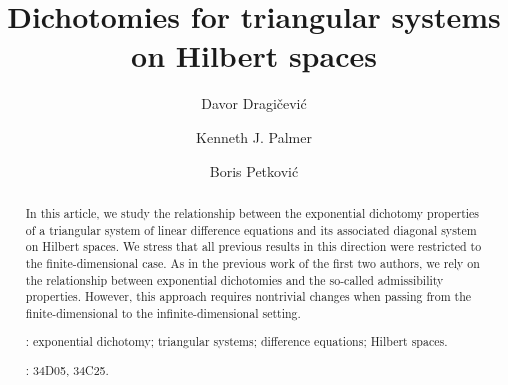 \documentclass[11pt,reqno,a4paper]{amsart}
\theoremstyle{plain}
\numberwithin{equation}{section}
\theoremstyle{remark}
\begin{document}
\title{Dichotomies for triangular systems on Hilbert spaces}

\author{Davor Dragi\v cevi\' c } 
\address{Faculty of Mathematics, University of Rijeka, Croatia}

\author{Kenneth J. Palmer}
\address{ National Taiwan University, Taipei, Taiwan}

\author{Boris Petkovi\' c}
\address{Faculty of Natural Sciences and Mathematics, University of Banja Luka, Bosnia and Herzegovina}

\begin{abstract}
In this article, we study the relationship between the exponential dichotomy properties of a triangular system of linear difference equations and its associated diagonal system on Hilbert spaces. We stress that all previous results in this direction were restricted to the finite-dimensional case. As in the previous work of the first two authors, we rely on the relationship between exponential dichotomies and the so-called admissibility properties. However, this approach requires nontrivial changes when passing from the finite-dimensional to the infinite-dimensional setting.

\vspace{3mm}

: exponential dichotomy; triangular systems; difference equations; Hilbert spaces.

\vspace{2mm}

: 34D05, 34C25.
\end{abstract}

\vspace{1cm}
\maketitle
\end{document}
